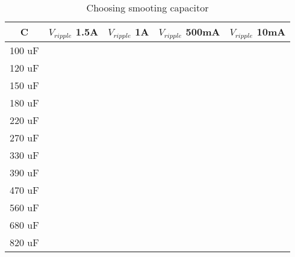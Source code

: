 \begin{table}[h]
\centering
\caption{Choosing smooting capacitor} \label{tab:choose-c}
\begin{tabular}{|c|c|c|c|c|} 
\firsthline
C & $V_{ripple}$ \@ 1.5A & $V_{ripple}$ \@ 1A & $V_{ripple}$ \@ 500mA & $V_{ripple}$ \@ 10mA \\ \hline \hline

100 uF &			 &		      &			      &		\\ \hline
120 uF  &			 &		      &			      &		\\ \hline
150 uF  &			 &		      &			      &		\\ \hline
180 uF  &			 &		      &			      &		\\ \hline
220 uF  &			 &		      &			      &		\\ \hline
270 uF  &			 &		      &			      &		\\ \hline
330 uF  &			 &		      &			      &		\\ \hline
390 uF  &			 &		      &			      &		\\ \hline
470 uF  &			 &		      &			      &		\\ \hline
560 uF  &			 &		      &			      &		\\ \hline
680 uF  &			 &		      &			      &		\\ \hline
820 uF  &			 &		      &			      &		\\ \hline
\end{tabular}
\end{table}

